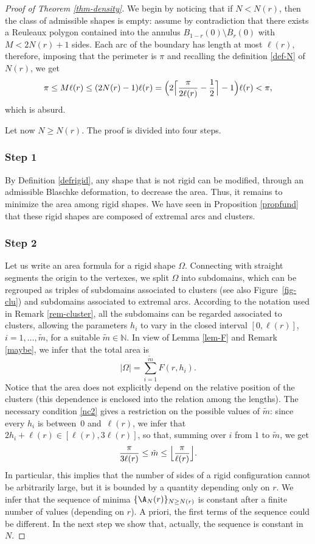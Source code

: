 \begin{proof}[Proof of Theorem \ref{thm-density}] We begin by noticing that if $N<N(r)$, then the class of admissible shapes is empty: assume by contradiction that there exists a Reuleaux polygon contained into the annulus $B_{1-r}(0)\setminus \overline{B}_r(0)$ with $M<2N(r)+1$ sides. Each arc of the boundary has length at most $\ell(r)$, therefore, imposing that the perimeter is $\pi$ and recalling the definition \eqref{def-N} of $N(r)$, we get
\[
\pi \leq M \ell(r) \leq (2N(r)-1) \ell(r)= \Bigl(2 \Bigl \lceil\frac{\pi}{2\ell(r)}-\frac12 \Bigr \rceil-1 \Bigr) \ell(r) < \pi,
\]
which is absurd.

Let now $N\geq N(r)$. The proof is divided into four steps.

\subsubsection*{Step 1} By Definition \ref{defrigid}, any shape that is not rigid can be modified, through an admissible
Blaschke deformation, to decrease the area. Thus, it remains to minimize the area
among rigid shapes. We have seen in Proposition \ref{propfund} that these rigid shapes
are composed of extremal arcs and clusters.

\subsubsection*{Step 2} Let us write an area formula for a rigid shape $\Omega$. Connecting with straight segments the origin to the vertexes, we split $\Omega$ into subdomains, which can be regrouped as triples of subdomains associated to clusters {(see also Figure~\ref{fig-clu})} and subdomains associated to extremal arcs. According to the notation used in Remark \ref{rem-cluster}, all the subdomains can be regarded associated to clusters, allowing the parameters $h_i$ to vary in the closed interval $[0,\ell(r)]$, $i=1, \ldots, \tilde{m}$, for a suitable $\tilde{m}\in \mathbb N$. In view of Lemma \ref{lem-F} and Remark \ref{maybe}, we infer that the total area is
\[
|\Omega|=\sum_{i=1}^{\tilde{m}}F(r, h_i).
\]
Notice that the area does not explicitly depend on the relative position of the clusters (this dependence is enclosed into the relation among the lengths).
The necessary condition \eqref{nc2} gives a restriction on the possible values of $\tilde{m}$: since every $h_i$ is between~$0$ and~$\ell(r)$, we infer that $2h_i + \ell(r) \in [\ell(r), 3 \ell(r)]$, so that, summing over $i$ from $1$ to $\tilde{m}$, we get
\begin{equation}\label{range}
\frac{\pi}{3\ell(r)}\leq \tilde{m} \leq \Bigl \lfloor\frac{\pi}{\ell(r)}\Bigr \rfloor.
\end{equation}
In particular, this implies that the number of sides of a rigid configuration cannot be arbitrarily large, but it is bounded by a quantity depending only on $r$. We infer that the sequence of minima $\{\A_N(r)\}_{N\geq N(r)}$ is constant after a finite number of values (depending on $r$). A priori, the first terms of the sequence could be different. In the next step we show that, actually, the sequence is constant in $N$.


\end{proof}
